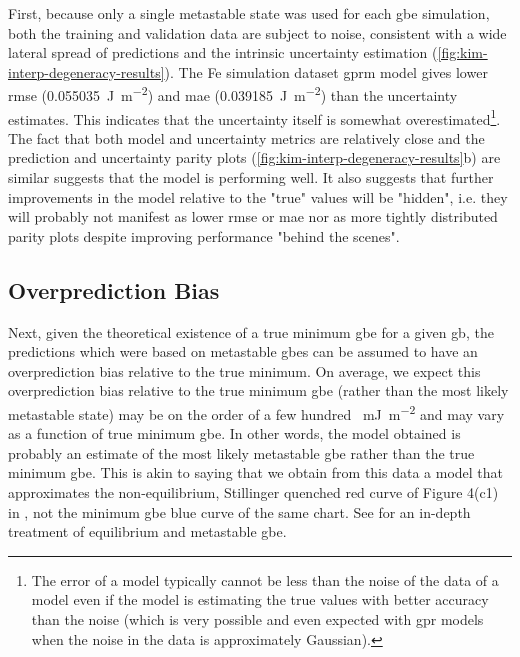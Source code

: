 \documentclass[preprint,12pt]{elsarticle}
\begin{document}
	First, because only a single metastable state was used for each \gls{gbe} simulation, both the training and validation data are subject to noise, consistent with a wide lateral spread of predictions and the intrinsic uncertainty estimation (\cref{fig:kim-interp-degeneracy-results}). The Fe simulation dataset \gls{gprm} model gives lower \gls{rmse} (\SI{0.055035}{\joule\per\square\meter}) and \gls{mae} (\SI{0.039185}{\joule\per\square\meter}) than the uncertainty estimates. This indicates that the uncertainty itself is somewhat overestimated\footnote{The \outpt{} error of a model typically cannot be less than the noise of the \outpt{} data of a model even if the model is estimating the true \outpt{} values with better accuracy than the noise (which is very possible and even expected with \gls{gpr} models when the noise in the \inpt{} data is approximately Gaussian).}. The fact that both model and uncertainty metrics are relatively close and the prediction \cite{bairdFiveDegreeofFreedomPropertyUnderReview} and uncertainty parity plots (\cref{fig:kim-interp-degeneracy-results}b) are similar suggests that the model is performing well. It also suggests that further improvements in the model relative to the "true" values will be "hidden", i.e. they will probably not manifest as lower \gls{rmse} or \gls{mae} nor as more tightly distributed parity plots despite improving performance "behind the scenes".

    \subsection{Overprediction Bias} \label{sec:results:lit:overprediction}
	Next, given the theoretical existence of a true minimum \gls{gbe} for a given \gls{gb}, the predictions which were based on metastable \glspl{gbe} can be assumed to have an overprediction bias relative to the true minimum. On average, we expect this overprediction bias relative to the true minimum \gls{gbe} (rather than the most likely metastable state) may be on the order of a few hundred \SI{}{\milli\J\per\square\m} and may vary as a function of true minimum \gls{gbe}. In other words, the model obtained is probably an estimate of the most likely metastable \gls{gbe} rather than the true minimum \gls{gbe}. This is akin to saying that we obtain from this data a model that approximates the non-equilibrium, Stillinger quenched red curve of Figure 4(c1) in \cite{hanGrainboundaryMetastabilityIts2016}, not the minimum \gls{gbe} blue curve of the same chart. See \cite{hanGrainboundaryMetastabilityIts2016} for an in-depth treatment of equilibrium and metastable \gls{gbe}.
\end{document}
